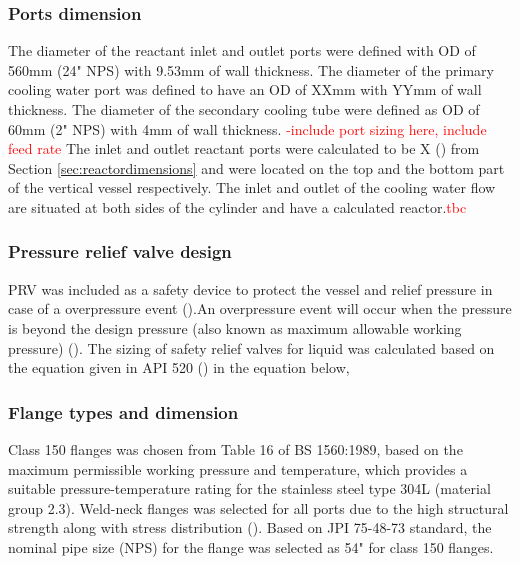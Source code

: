 \subsubsection{Ports dimension}
The diameter of the reactant inlet and outlet ports were defined with OD of 560mm (24" NPS) with 9.53mm of wall thickness. 
The diameter of the primary cooling water port was defined to have an OD of XXmm with YYmm of wall thickness. 
The diameter of the secondary cooling tube were defined as OD of 60mm (2" NPS) with 4mm of wall thickness. 
\textcolor{red}{-include port sizing here, include feed rate}
The inlet and outlet reactant ports were calculated to be X () from Section \ref{sec:reactordimensions} and were located on the top and the bottom part of the vertical vessel respectively. 
The inlet and outlet of the cooling water flow are situated at both sides of the cylinder and have a calculated  reactor.\textcolor{red}{tbc}

\subsubsection{Pressure relief valve design}
PRV was included as a safety device to protect the vessel and relief pressure in case of a overpressure event ().An overpressure event will occur when the pressure is beyond the design pressure (also known as maximum allowable working pressure) (). The sizing of safety relief valves for liquid was calculated based on the equation given in API 520 () in the equation below,
\begin{equation}
    
\end{equation}




\subsubsection{Flange types and dimension}
Class 150 flanges was chosen from Table 16 of BS 1560:1989, based on the maximum permissible working pressure and temperature, which provides a suitable pressure-temperature rating for the stainless steel type 304L (material group 2.3). Weld-neck flanges was selected for all ports due to the high structural strength along with stress distribution ().
Based on JPI 75-48-73 standard, the nominal pipe size (NPS) for the flange was selected as 54" for class 150 flanges.
